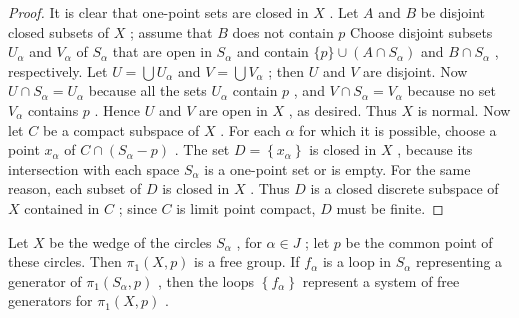 \begin{proof}It is clear that one-point sets are closed in \(X\) . Let \(A\) and \(B\) be disjoint closed subsets of \(X\) ; assume that \(B\) does not contain \(p\) Choose disjoint subsets \({U}_{\alpha }\) and \({V}_{\alpha }\) of \({S}_{\alpha }\) that are open in \({S}_{\alpha }\) and contain \(\{ p\}  \cup  \left( {A \cap  {S}_{\alpha }}\right)\) and \(B \cap  {S}_{\alpha }\) , respectively. Let \(U = \bigcup {U}_{\alpha }\) and \(V = \bigcup {V}_{\alpha }\) ; then \(U\) and \(V\) are disjoint. Now \(U \cap  {S}_{\alpha } = {U}_{\alpha }\) because all the sets \({U}_{\alpha }\) contain \(p\) , and \(V \cap  {S}_{\alpha } = {V}_{\alpha }\) because no set \({V}_{\alpha }\) contains \(p\) . Hence \(U\) and \(V\) are open in \(X\) , as desired. Thus \(X\) is normal.
Now let \(C\) be a compact subspace of \(X\) . For each \(\alpha\) for which it is possible, choose a point \({x}_{\alpha }\) of \(C \cap  \left( {{S}_{\alpha } - p}\right)\) . The set \(D = \left\{  {x}_{\alpha }\right\}\) is closed in \(X\) , because its intersection with each space \({S}_{\alpha }\) is a one-point set or is empty. For the same reason, each subset of \(D\) is closed in \(X\) . Thus \(D\) is a closed discrete subspace of \(X\) contained in \(C\) ; since \(C\) is limit point compact, \(D\) must be finite.
\end{proof}
\begin{theorem} Let \(X\) be the wedge of the circles \({S}_{\alpha }\) , for \(\alpha  \in  J\) ; let \(p\) be the common point of these circles. Then \({\pi }_{1}\left( {X,p}\right)\) is a free group. If \({f}_{\alpha }\) is a loop in \({S}_{\alpha }\) representing a generator of \({\pi }_{1}\left( {{S}_{\alpha },p}\right)\) , then the loops \(\left\{  {f}_{\alpha }\right\}\) represent a system of free generators for \({\pi }_{1}\left( {X,p}\right)\) .
\end{theorem}

